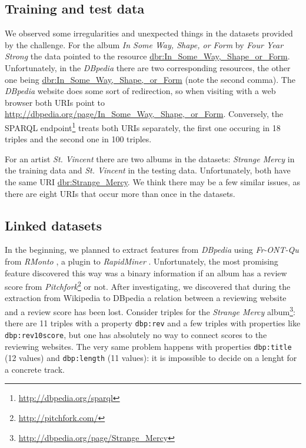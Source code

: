 \documentclass{llncs}
\begin{document}
\subsection{Training and test data}
We observed some irregularities and unexpected things in the datasets provided by the challenge.
For the album \emph{In Some Way, Shape, or Form} by \emph{Four Year Strong} the data pointed to the resource \url{dbr:In_Some_Way,_Shape_or_Form}.
Unfortunately, in the \emph{DBpedia} \cite{dbpedia} there are two corresponding resources, the other one being \url{dbr:In_Some_Way,_Shape,_or_Form} (note the second comma).
The \emph{DBpedia} website does some sort of redirection, so when visiting with a web browser both URIs point to \url{http://dbpedia.org/page/In_Some_Way,_Shape,_or_Form}.
Conversely, the SPARQL endpoint\footnote{\url{http://dbpedia.org/sparql}} treats both URIs separately, the first one occuring in 18 triples and the second one in 100 triples.

For an artist \emph{St. Vincent} there are two albums in the datasets: \emph{Strange Mercy} in the training data and \emph{St. Vincent} in the testing data.
Unfortunately, both have the same URI \url{dbr:Strange_Mercy}.
We think there may be a few similar issues, as there are eight URIs that occur more than once in the datasets.
%

\subsection{Linked datasets\label{sec:ld}}
In the beginning, we planned to extract features from \emph{DBpedia} using \emph{Fr-ONT-Qu} \cite{frontqu} from \emph{RMonto} \cite{rmonto}, a plugin to \emph{RapidMiner} \cite{rapidminer}.
Unfortunately, the most promising feature discovered this way was a binary information if an album has a review score from \emph{Pitchfork}\footnote{\url{http://pitchfork.com/}} or not.
After investigating, we discovered that during the extraction from Wikipedia to DBpedia a relation between a reviewing website and a review score has been lost.
Consider triples for the \emph{Strange Mercy} album\footnote{\url{http://dbpedia.org/page/Strange_Mercy}}: there are 11 triples with a property \texttt{dbp:rev} and a few triples with properties like \texttt{dbp:rev10score}, but one has absolutely no way to connect scores to the reviewing websites.
The very same problem happens with properties \texttt{dbp:title} (12 values) and \texttt{dbp:length} (11 values): it is impossible to decide on a lenght for a concrete track.
\end{document}
